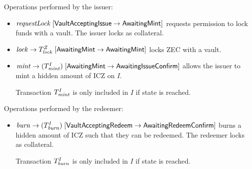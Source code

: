 Operations performed by the issuer:
\begin{itemize}
    \item $\mathit{requestLock} \; [\mathsf{VaultAcceptingIssue} \rightarrow \mathsf{AwaitingMint}]$ requests permission to lock funds with a vault.
    The issuer locks \iw as collateral.
    
    \item $\mathit{lock} \rightarrow T^Z_{\mathit{lock}} \; [\mathsf{AwaitingMint} \rightarrow \mathsf{AwaitingMint}]$ locks ZEC with a vault.
    
    \item $\mathit{mint} \rightarrow (T^I_{\mathit{mint}}) \; [\mathsf{AwaitingMint} \rightarrow \mathsf{AwaitingIssueConfirm}]$ allows the issuer to mint a hidden amount of ICZ on $I$.
    
    Transaction $T^I_{\mathit{mint}}$ is only included in $I$ if state \stateis is reached.
\end{itemize}

Operations performed by the redeemer:
\begin{itemize}
    \item $\mathit{burn} \rightarrow (T^I_{\mathit{burn}}) \; [\mathsf{Vault\-Accepting\-Redeem} \rightarrow \mathsf{AwaitingRedeemConfirm}]$ burns a hidden amount of ICZ such that they can be redeemed.
    The redeemer locks \iw as collateral.
    
    Transaction $T^I_{\mathit{burn}}$ is only included in $I$ if state \staters is reached.
\end{itemize}

